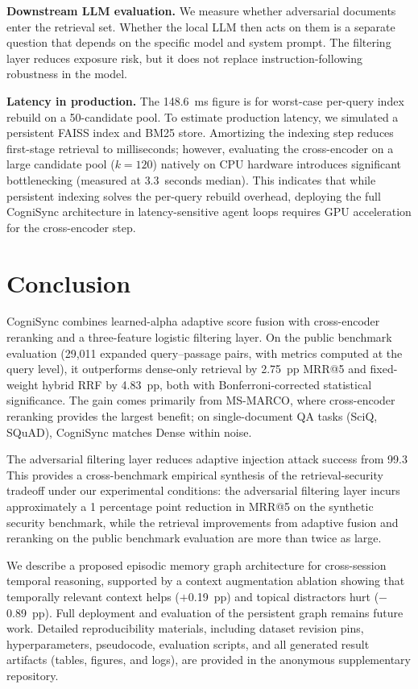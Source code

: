 \documentclass[sigconf]{acmart}
\begin{document}
\textbf{Downstream LLM evaluation.} We measure whether adversarial documents
enter the retrieval set. Whether the local LLM then acts on them is a separate
question that depends on the specific model and system prompt. The filtering
layer reduces exposure risk, but it does not replace instruction-following
robustness in the model.

\textbf{Latency in production.} The 148.6~ms figure is for worst-case per-query index rebuild on a 50-candidate pool. To estimate production latency, we simulated a persistent FAISS index and BM25 store. Amortizing the indexing step reduces first-stage retrieval to milliseconds; however, evaluating the cross-encoder on a large candidate pool ($k{=}120$) natively on CPU hardware introduces significant bottlenecking (measured at $3.3$~seconds median). This indicates that while persistent indexing solves the per-query rebuild overhead, deploying the full CogniSync architecture in latency-sensitive agent loops requires GPU acceleration for the cross-encoder step.

\section{Conclusion}

CogniSync combines learned-alpha adaptive score fusion with cross-encoder
reranking and a three-feature logistic filtering layer. On the public benchmark evaluation (29,011 expanded query--passage pairs, with
metrics computed at the query level), it outperforms dense-only retrieval by 2.75~pp
MRR@5 and fixed-weight hybrid RRF by 4.83~pp, both with Bonferroni-corrected
statistical significance. The gain comes primarily from MS-MARCO, where
cross-encoder reranking provides the largest benefit; on single-document QA
tasks (SciQ, SQuAD), CogniSync matches Dense within noise.

The adversarial filtering layer reduces adaptive injection attack success from
99.3%
This provides a cross-benchmark empirical synthesis of the retrieval-security
tradeoff under our experimental conditions: the adversarial filtering layer
incurs approximately a 1 percentage point reduction in MRR@5 on the synthetic
security benchmark, while the retrieval improvements from adaptive fusion and
reranking on the public benchmark evaluation are more than twice as large.

We describe a proposed episodic memory graph architecture for cross-session
temporal reasoning, supported by a context augmentation ablation showing that
temporally relevant context helps ($+$0.19~pp) and topical distractors hurt
($-$0.89~pp). Full deployment and evaluation of the persistent graph remains
future work. Detailed reproducibility materials, including dataset revision pins,
hyperparameters, pseudocode, evaluation scripts, and all generated result
artifacts (tables, figures, and logs), are provided in the anonymous
supplementary repository.



\end{document}

